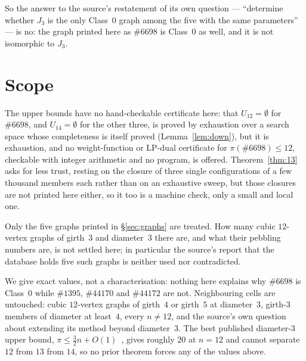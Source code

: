\documentclass[11pt]{amsart}
\theoremstyle{remark}
\newcommand{\HoG}[1]{\#\mathrm{#1}}
\begin{document}
So the answer to the source's restatement of its own question --- ``determine
whether $J_3$ is the only Class~$0$ graph among the five with the same
parameters'' --- is no: the graph printed here as $\HoG{6698}$ is Class~$0$ as
well, and it is not isomorphic to $J_3$.

\section{Scope}\label{sec:scope}

The upper bounds have no hand-checkable certificate here: that
$U_{12}=\emptyset$ for $\HoG{6698}$, and $U_{14}=\emptyset$ for the other three,
is proved by exhaustion over a search space whose completeness is itself proved
(Lemma~\ref{lem:down}), but it is exhaustion, and no weight-function or LP-dual
certificate for $\pi(\HoG{6698})\le12$, checkable with integer arithmetic and no
program, is offered. Theorem~\ref{thm:13} asks for less trust, resting on the
closure of three single configurations of a few thousand members each rather than
on an exhaustive sweep, but those closures are not printed here either, so it too
is a machine check, only a small and local one.

Only the five graphs printed in \S\ref{sec:graphs} are treated. How many cubic
$12$-vertex graphs of girth~$3$ and diameter~$3$ there are, and what their
pebbling numbers are, is not settled here; in particular the source's report that
the database holds five such graphs is neither used nor contradicted.

We give exact values, not a characterisation: nothing here explains why
$\HoG{6698}$ is Class~$0$ while $\HoG{1395}$, $\HoG{44170}$ and $\HoG{44172}$ are
not. Neighbouring cells are untouched: cubic $12$-vertex graphs of girth~$4$ or
girth~$5$ at diameter~$3$, girth-$3$ members of diameter at least~$4$, every
$n\ne12$, and the source's own question about extending its method beyond
diameter~$3$. The best published diameter-$3$ upper bound,
$\pi\le\frac{3}{2}n+O(1)$~\cite{bukh,psy}, gives roughly $20$ at $n=12$ and
cannot separate $12$ from $13$ from $14$, so no prior theorem forces any of the
values above.
\end{document}
